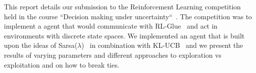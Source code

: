 This report details our submission to the Reinforcement Learning competition
held in the course ``Decision making under uncertainty``~\cite{decmaking}. The
competition was to implement a agent that would communicate with
RL-Glue~\cite{rl-glue} and act in environments with discrete state spaces. We
implemented an agent that is built upon the ideas of
Sarsa($\lambda$)~\cite{Sutton:1998:IRL:551283} in combination with
KL-UCB~\cite{garivier2011kl} and we present the results of varying parameters
and different approaches to exploration vs exploitation and on how to break
ties.
